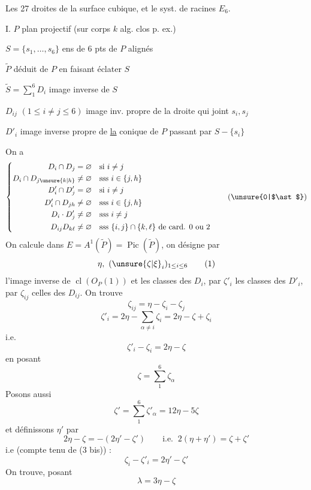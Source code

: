Les 27 droites de la surface cubique, et le syst. de racines $E_6$.

I. \quad $P$ plan projectif (sur corps $k$ alg. clos p. ex.)

$S=\{s_1,\ldots,s_6\}$ ens de 6 pts de $P$   alignés  

$\widetilde P$ déduit de $P$ en faisant éclater $S$

$\widetilde S=\sum_1^6D_i$ image inverse de $S$

$D_{ij}$ $(1\le i\ne j\le6)$ image inv. propre de la droite qui joint $s_i,s_j$

$D'_i$ image inverse propre de \uline{la} conique de $P$ passant par $S-\{s_i\}$

On a
\[
\left\{\begin{aligned}
D_i\cap D_j&=\varnothing &&\text{si }i\ne j\\
D_i\cap D_{j\unsure{k|h}}&\ne\varnothing &&\text{sss }i\in\{j,h\}\\
D'_i\cap D'_j&=\varnothing &&\text{si }i\ne j\\
D'_i\cap D_{jh}&\ne\varnothing &&\text{sss }i\in\{j,h\}\\
D_i\cdot D'_j&\ne\varnothing &&\text{sss }i\ne j\\
D_{ij}D_{k\ell}&\ne\varnothing &&\text{sss }\{i,j\}\cap\{k,\ell\}\text{ de card. }0\text{ ou }2
\end{aligned}\right.\tag*{(\unsure{0|$\ast$})}
\]
On calcule dans $E=A^1(\widetilde P)=\operatorname{Pic}(\widetilde P)$, on désigne par
\[
\eta,\ (\unsure{\zeta|\xi}_i)_{1\le i\le6}\tag*{(1)}
\]
l'image inverse de $\operatorname{cl}(O_P(1))$ et les classes des $D_i$, par $\zeta'_i$ les classes des $D'_i$, par $\zeta_{ij}$ celles des $D_{ij}$. On trouve
\[
\zeta_{ij}=\eta-\zeta_i-\zeta_j\tag*{(2)}
\]
\[
\zeta'_i=2\eta-\sum_{\alpha\ne i}\zeta_i=2\eta-\zeta+\zeta_i\tag*{(3)}
\]
i.e.
\[
\zeta'_i-\zeta_i=2\eta-\zeta\tag*{(3 bis)}
\]
en posant
\[
\zeta=\sum_1^6\zeta_\alpha\tag*{(4)}
\]
Posons aussi
\[
\zeta'=\sum_1^6\zeta'_\alpha=12\eta-5\zeta\tag*{(4')}
\]
et définissons $\eta'$ par
\[
2\eta-\zeta=-(2\eta'-\zeta')\qquad\text{i.e. }\ 2(\eta+\eta')=\zeta+\zeta'\tag*{(5)}
\]
i.e (compte tenu de (3 bis)) :
\[
\zeta_i-\zeta'_i=2\eta'-\zeta'\tag*{(5 bis)}
\]
On trouve, posant
\[
\lambda=3\eta-\zeta\tag*{(6)}
\]
